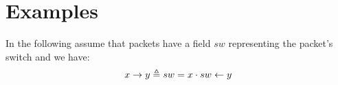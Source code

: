 \section{Examples}

In the following assume that packets have a field $sw$
representing the packet's switch and we have:
\begin{equation*}
    x \rightarrow y \triangleq sw = x \cdot sw \leftarrow y
\end{equation*}





